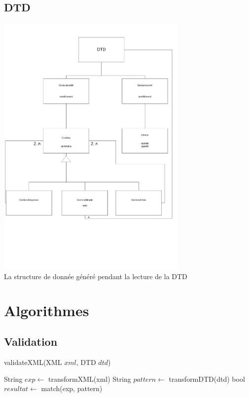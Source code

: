     \subsection{DTD}
        \includegraphics[width=0.7\textwidth]{img/ClassesDTD.pdf}\\
        La structure de donnée généré pendant la lecture de la DTD
        
\section{Algorithmes}

    \subsection{Validation}
	
	\begin{algorithm}
	\caption{validateXML(XML $xml$, DTD $dtd$)}
	\begin{algorithmic}
	    \STATE String $exp \gets$ transformXML(xml) 
	    \STATE String $pattern \gets$ transformDTD(dtd) 
	    \STATE bool $resultat \gets$ match(exp, pattern) 
    \end{algorithmic}
    \end{algorithm}
    
